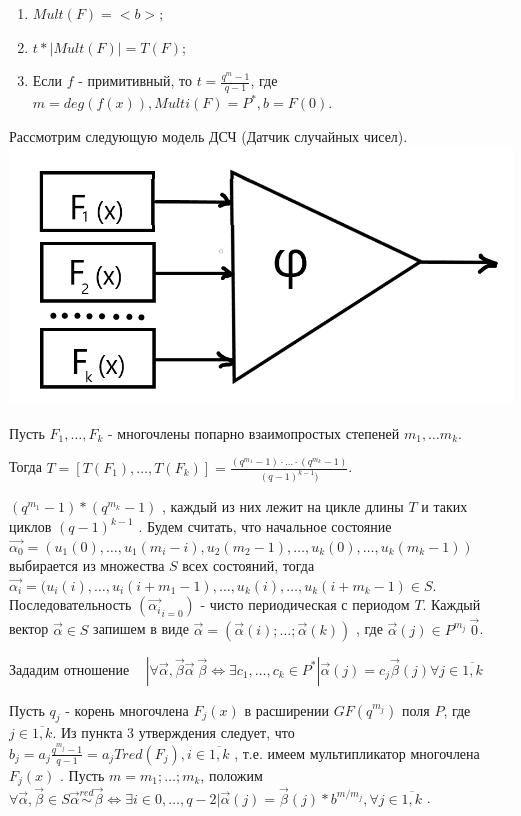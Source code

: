 \begin{enumerate}
\item $Mult(F) = <b>$;
\item $t * |Mult(F)|=T(F)$;
\item  Если $f$ - примитивный, то $t= \frac{q^m - 1}{q-1}$, где $m=deg(f(x)), Multi(F)=P^*, b=F(0)$.
\end{enumerate}

Рассмотрим следующую модель ДСЧ (Датчик случайных чисел).\\

\includegraphics[scale=0.35]{DSC}

Пусть $F_1, \dots, F_k$ - многочлены попарно взаимопростых степеней $m_1, \dots m_k$.

Тогда $T=[T(F_1), \dots, T(F_k)] = \frac{(q^{m_1} - 1) \cdot \ldots \cdot (q^{m_k} - 1)}{(q-1)^{k-1})}$.

$(q^{m_1} - 1) * (q^{m_k} - 1)$ , каждый из них лежит на цикле длины $T$ и таких циклов $(q-1)^{k-1}$ . Будем считать, что начальное состояние $\vec{\alpha_0} = (u_1(0), \dots, u_1(m_i - i), u_2(m_2-1), \dots, u_k(0), \dots, u_k(m_k-1))$ выбирается из множества $S$ всех состояний, тогда $\vec{\alpha_i}=(u_i(i), \dots, u_i(i+m_1-1), \dots, u_k(i), \dots, u_k(i+m_k-1) \in S$.
 Последовательность $(\vec{\alpha_i}_{i=0})$ - чисто периодическая с периодом $T$.
Каждый вектор $\vec{\alpha} \in S$ запишем в виде $\vec{\alpha} = (\vec{\alpha}(i); \dots; \vec{\alpha}(k))$ , где $\vec{\alpha}(j) \in P^{m_j} \ {\vec{0}}$.

Зададим отношение ~ $|\forall \vec{\alpha}, \vec{\beta} \vec{\alpha}~\vec{\beta} \Leftrightarrow \exists c_1, \dots, c_k \in P^*|\vec{\alpha}(j) = c_j \vec{\beta}(j) \forall j \in \overline{1,k}$

Пусть $q_j$ - корень многочлена $F_j(x)$ в расширении $GF(q^{m_j})$ поля $P$, где $j \in \overline{1,k}$. Из пункта 3 утверждения следует, что $b_j = a_j \frac{q^{m_j}-1}{q-1} = a_j Tred(F_j), i \in \overline{1,k}$ , т.е. имеем мультипликатор многочлена $F_j(x)$ . Пусть $m=m_1; \dots; m_k$, положим $\forall \vec{\alpha}, \vec{\beta} \in S  \vec{\alpha} \stackrel{red}{\sim} \vec{\beta} \Leftrightarrow \exists i \in {0, \dots, q-2} | \vec{\alpha}(j) = \vec{\beta}(j) * b^{m/m_j}, \forall j \in \overline{1,k}$ .

